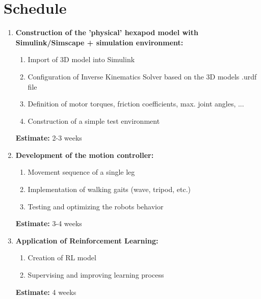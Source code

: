 \section{Schedule}
\begin{enumerate}
	\item \textbf{Construction of the 'physical' hexapod model with Simulink/Simscape + simulation environment:}
	\begin{enumerate}[label*=\arabic*.]
		\item Import of 3D model into Simulink
		\item Configuration of Inverse Kinematics Solver based on the 3D models .urdf file
		\item Definition of motor torques, friction coefficients, max. joint angles, ...
		\item Construction of a simple test environment
	\end{enumerate}
	\textbf{Estimate:} 2-3 weeks
	
	\item \textbf{Development of the motion controller:}
	\begin{enumerate}[label*=\arabic*.]
		\item Movement sequence of a single leg
		\item Implementation of walking gaits (wave, tripod, etc.)	
		\item Testing and optimizing the robots behavior
	\end{enumerate}
	\textbf{Estimate:} 3-4 weeks
	
	\item \textbf{Application of Reinforcement Learning:}
	\begin{enumerate}[label*=\arabic*.]
		\item Creation of RL model
		\item Supervising and improving learning process
	\end{enumerate}
	\textbf{Estimate:} 4 weeks
\end{enumerate}
